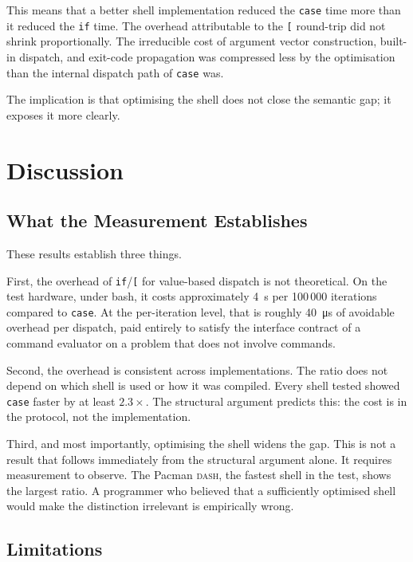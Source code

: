 \documentclass[11pt,a4paper]{article}
\begin{document}
This means that a better shell implementation reduced the
\texttt{case} time more than it reduced the \texttt{if} time.
The overhead attributable to the \texttt{[} round-trip did not shrink
proportionally.
The irreducible cost of argument vector construction, built-in
dispatch, and exit-code propagation was compressed less by the
optimisation than the internal dispatch path of \texttt{case} was.

The implication is that optimising the shell does not close the
semantic gap; it exposes it more clearly.

\section{Discussion}

\subsection{What the Measurement Establishes}

These results establish three things.

First, the overhead of \texttt{if}/\texttt{[} for value-based
dispatch is not theoretical.
On the test hardware, under bash, it costs approximately
\SI{4}{\second} per 100\,000 iterations compared to \texttt{case}.
At the per-iteration level, that is roughly \SI{40}{\micro\second}
of avoidable overhead per dispatch, paid entirely to satisfy the
interface contract of a command evaluator on a problem that
does not involve commands.

Second, the overhead is consistent across implementations.
The ratio does not depend on which shell is used or how it was
compiled.
Every shell tested showed \texttt{case} faster by at least
$2.3\times$.
The structural argument predicts this: the cost is in the protocol,
not the implementation.

Third, and most importantly, optimising the shell widens the gap.
This is not a result that follows immediately from the structural
argument alone.
It requires measurement to observe.
The Pacman \textsc{dash}, the fastest shell in the test, shows
the largest ratio.
A programmer who believed that a sufficiently optimised shell would
make the distinction irrelevant is empirically wrong.

\subsection{Limitations}
\end{document}
